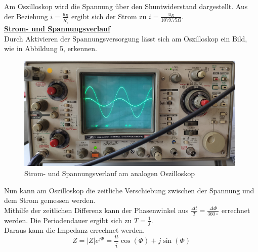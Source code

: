 \documentclass[a4paper,12pt]{article}
\begin{document}
	Am Oszilloskop wird die Spannung über den Shuntwiderstand dargestellt. Aus der Beziehung \(i=\frac{u_R}{\bar{R_i}}\) ergibt sich der Strom zu \(i=\frac{u_R}{1079.75\Omega}\).\\
	\newpage
	\noindent
	\underline{\textbf{Strom- und Spannungsverlauf}}\\ \newline
	Durch Aktivieren der Spannungsversorgung lässt sich am Oszilloskop ein Bild, wie in Abbildung 5, erkennen. \newline
	\begin{figure}[h]
		\centering
		\includegraphics[width=11cm]{assets/strom_spannung}
		\caption{Strom- und Spannungsverlauf am analogen Oszilloskop}
	\end{figure}
	\newline
	Nun kann am Oszilloskop die zeitliche Verschiebung zwischen der Spannung und dem Strom gemessen werden.\\ Mithilfe der zeitlichen Differenz kann der Phasenwinkel aus \(\frac{\Delta t}{T}=\frac{\Delta \Phi}{360\circ}\) errechnet werden. Die Periodendauer ergibt sich zu \(T=\frac{1}{f}\). \\ \newline
	Daraus kann die Impedanz errechnet werden.
	\[Z=|Z|e^{j\Phi}=\frac{u}{i}\cos(\Phi) + j \sin(\Phi)\]\newpage
\end{document}
